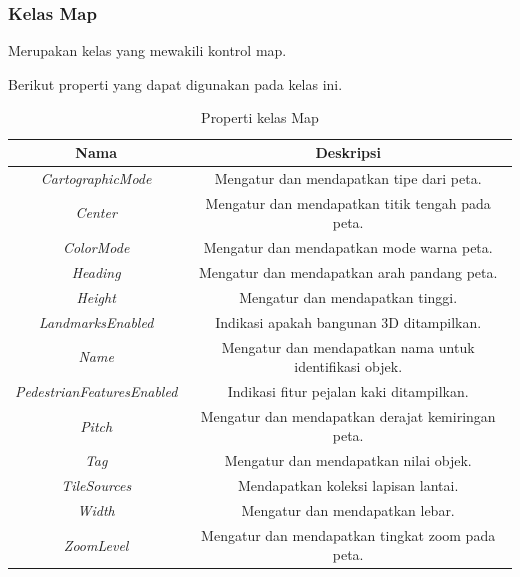 \subsubsection{Kelas Map}
\label{subsubsec:Kelas Map}
\hspace{0.5cm} Merupakan kelas yang mewakili kontrol map.

Berikut properti yang dapat digunakan pada kelas ini.
\begin{table}[h]
	\centering
		\begin{tabular}{ |c|c|}
				\hline
					Nama & Deskripsi \\ \hline
					\textit{CartographicMode} & Mengatur dan mendapatkan tipe dari peta. \\ \hline
					\textit{Center} & Mengatur dan mendapatkan titik tengah pada peta. \\ \hline
					\textit{ColorMode} & Mengatur dan mendapatkan mode warna peta. \\ \hline
					\textit{Heading} & Mengatur dan mendapatkan arah pandang peta. \\ \hline
					\textit{Height} & Mengatur dan mendapatkan tinggi. \\ \hline
					\textit{LandmarksEnabled} & Indikasi apakah bangunan 3D ditampilkan. \\ \hline
					\textit{Name} & Mengatur dan mendapatkan nama untuk identifikasi objek. \\ \hline
					\textit{PedestrianFeaturesEnabled} & Indikasi fitur pejalan kaki ditampilkan. \\ \hline
					\textit{Pitch} & Mengatur dan mendapatkan derajat kemiringan peta. \\ \hline
					\textit{Tag} & Mengatur dan mendapatkan nilai objek. \\ \hline
					\textit{TileSources} & Mendapatkan koleksi lapisan lantai. \\ \hline
					\textit{Width} & Mengatur dan mendapatkan lebar. \\ \hline
					\textit{ZoomLevel} & Mengatur dan mendapatkan tingkat zoom pada peta. \\ \hline
				\hline
		\end{tabular}
	\caption{Properti kelas Map}
	\label{tab:PropertiKelasMap}
\end{table}

